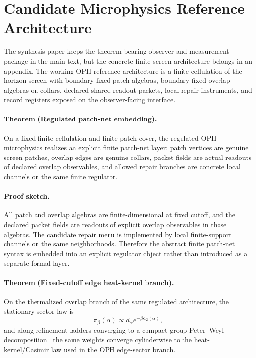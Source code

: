 \section{Candidate Microphysics Reference Architecture}

The synthesis paper keeps the theorem-bearing observer and measurement package in the main text,
but the concrete finite screen architecture belongs in an appendix. The working OPH reference
architecture is a finite cellulation of the horizon screen with boundary-fixed patch algebras,
boundary-fixed overlap algebras on collars, declared shared readout packets, local repair
instruments, and record registers exposed on the observer-facing interface.

\paragraph{Theorem (Regulated patch-net embedding).}
On a fixed finite cellulation and finite patch cover, the regulated OPH microphysics realizes an
explicit finite patch-net layer: patch vertices are genuine screen patches, overlap edges are
genuine collars, packet fields are actual readouts of declared overlap observables, and allowed
repair branches are concrete local channels on the same finite regulator.

\paragraph{Proof sketch.}
All patch and overlap algebras are finite-dimensional at fixed cutoff, and the declared packet
fields are readouts of explicit overlap observables in those algebras. The candidate repair menu
is implemented by local finite-support channels on the same neighborhoods. Therefore the abstract
finite patch-net syntax is embedded into an explicit regulator object rather than introduced as a
separate formal layer.

\paragraph{Theorem (Fixed-cutoff edge heat-kernel branch).}
On the thermalized overlap branch of the same regulated architecture, the stationary sector law is
\[
\pi_\beta(\alpha)\propto d_\alpha e^{-\beta C_2(\alpha)},
\]
and along refinement ladders converging to a compact-group Peter--Weyl decomposition~\cite{peterWeyl27} the same
weights converge cylinderwise to the heat-kernel/Casimir law used in the OPH edge-sector branch.


